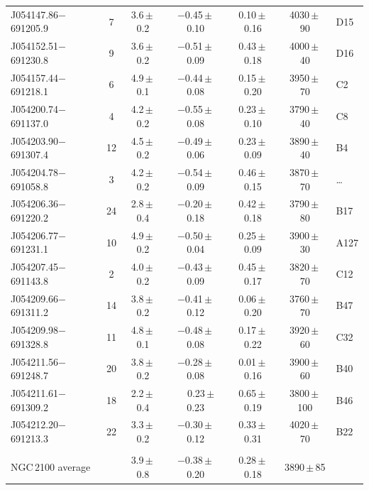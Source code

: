 \documentclass[useAMS,usenatbib]{mn2e}
\def\pp{$\phantom{-}$}
\begin{document}
\begin{table}
\begin{center}
\begin{threeparttable}
\begin{tabular}{lc ccccl}
J054147.86$-$691205.9 & 7  & 3.6\,$\pm$\,0.2 & $-$0.45\,$\pm$\,0.10 & 0.10\,$\pm$\,0.16 & 4030\,$\pm$\, 90 & D15\\
J054152.51$-$691230.8 & 9  & 3.6\,$\pm$\,0.2 & $-$0.51\,$\pm$\,0.09 & 0.43\,$\pm$\,0.18 & 4000\,$\pm$\, 40 & D16\\
J054157.44$-$691218.1 & 6  & 4.9\,$\pm$\,0.1 & $-$0.44\,$\pm$\,0.08 & 0.15\,$\pm$\,0.20 & 3950\,$\pm$\, 70 & C2\\ %
J054200.74$-$691137.0 & 4  & 4.2\,$\pm$\,0.2 & $-$0.55\,$\pm$\,0.08 & 0.23\,$\pm$\,0.10 & 3790\,$\pm$\, 40 & C8\\
J054203.90$-$691307.4 & 12 & 4.5\,$\pm$\,0.2 & $-$0.49\,$\pm$\,0.06 & 0.23\,$\pm$\,0.09 & 3890\,$\pm$\, 40 & B4\\
J054204.78$-$691058.8 & 3  & 4.2\,$\pm$\,0.2 & $-$0.54\,$\pm$\,0.09 & 0.46\,$\pm$\,0.15 & 3870\,$\pm$\, 70 & \ldots\\
J054206.36$-$691220.2 & 24 & 2.8\,$\pm$\,0.4 & $-$0.20\,$\pm$\,0.18 & 0.42\,$\pm$\,0.18 & 3790\,$\pm$\, 80 & B17\\
J054206.77$-$691231.1 & 10 & 4.9\,$\pm$\,0.2 & $-$0.50\,$\pm$\,0.04 & 0.25\,$\pm$\,0.09 & 3900\,$\pm$\, 30 & A127\\
J054207.45$-$691143.8 & 2  & 4.0\,$\pm$\,0.2 & $-$0.43\,$\pm$\,0.09 & 0.45\,$\pm$\,0.17 & 3820\,$\pm$\, 70 & C12\\
J054209.66$-$691311.2 & 14 & 3.8\,$\pm$\,0.2 & $-$0.41\,$\pm$\,0.12 & 0.06\,$\pm$\,0.20 & 3760\,$\pm$\, 70 & B47\\
J054209.98$-$691328.8 & 11 & 4.8\,$\pm$\,0.1 & $-$0.48\,$\pm$\,0.08 & 0.17\,$\pm$\,0.22 & 3920\,$\pm$\, 60 & C32\\
J054211.56$-$691248.7 & 20 & 3.8\,$\pm$\,0.2 & $-$0.28\,$\pm$\,0.08 & 0.01\,$\pm$\,0.16 & 3900\,$\pm$\, 60 & B40\\
J054211.61$-$691309.2 & 18 & 2.2\,$\pm$\,0.4 & \pp0.23\,$\pm$\,0.23 & 0.65\,$\pm$\,0.19 & 3800\,$\pm$\,100 & B46\\
J054212.20$-$691213.3 & 22 & 3.3\,$\pm$\,0.2 & $-$0.30\,$\pm$\,0.12 & 0.33\,$\pm$\,0.31 & 4020\,$\pm$\, 70 & B22\\
\\
NGC\,2100 average & & 3.9\,$\pm$\,0.8 & $-$0.38\,$\pm$\,0.20 &  0.28\,$\pm$\,0.18 & 3890\,$\pm$\,85 &\\


\end{tabular}
\end{threeparttable}
\end{center}
\end{table}
\end{document}
